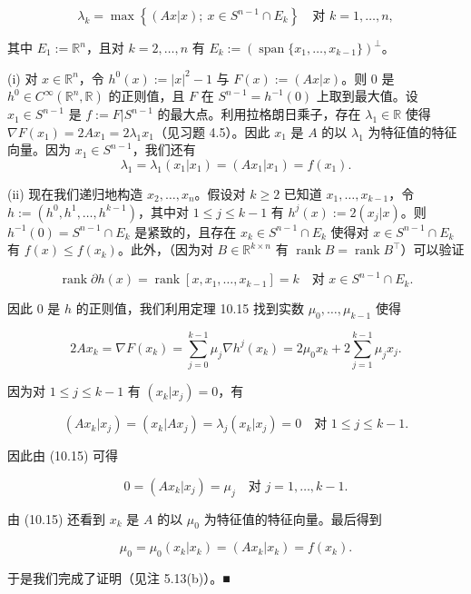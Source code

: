 \begin{example}
\begin{items}
\[
\lambda_{k} = \max\left\{ (Ax|x) ;\ x \in S^{n-1}\cap E_{k} \right\} \quad \text{对 } k = 1, \ldots, n ,
\]

其中 $ E_{1} := \mathbb{R}^{n} $，且对 $ k = 2, \ldots, n $ 有 $ E_{k} := \left(\operatorname{span}\{x_{1}, \ldots, x_{k-1}\}\right)^{\perp} $。

\proofhead
(i) 对 $ x \in \mathbb{R}^{n} $，令 $ h^{0}(x) := |x|^{2} - 1 $ 与 $ F(x) := (Ax|x) $。则 0 是 $ h^{0} \in C^{\infty}(\mathbb{R}^{n},\mathbb{R}) $ 的正则值，且 $ F $ 在 $ S^{n-1} = h^{-1}(0) $ 上取到最大值。设 $ x_{1} \in S^{n-1} $ 是 $ f := F|S^{n-1} $ 的最大点。利用拉格朗日乘子，存在 $ \lambda_{1} \in \mathbb{R} $ 使得 $ \nabla F(x_{1}) = 2Ax_{1} = 2\lambda_{1}x_{1} $（见习题 4.5）。因此 $ x_{1} $ 是 $ A $ 的以 $ \lambda_{1} $ 为特征值的特征向量。因为 $ x_{1} \in S^{n-1} $，我们还有
\[
\lambda_{1} = \lambda_{1}(x_{1}|x_{1}) = (Ax_{1}|x_{1}) = f(x_{1}) .
\]
\end{items}

(ii) 现在我们递归地构造 $ x_{2}, \ldots, x_{n} $。假设对 $ k \ge 2 $ 已知道 $ x_{1}, \ldots, x_{k-1} $，令 $ h := (h^{0}, h^{1}, \ldots, h^{k-1}) $，其中对 $ 1 \le j \le k-1 $ 有 $ h^{j}(x) := 2(x_{j}|x) $。则 $ h^{-1}(0) = S^{n-1}\cap E_{k} $ 是紧致的，且存在 $ x_{k} \in S^{n-1}\cap E_{k} $ 使得对 $ x \in S^{n-1}\cap E_{k} $ 有 $ f(x) \le f(x_{k}) $。此外，（因为对 $ B \in \mathbb{R}^{k\times n} $ 有 $ \operatorname{rank} B = \operatorname{rank} B^{\top} $）可以验证

\[
\operatorname{rank}\partial h(x) = \operatorname{rank}[x, x_{1}, \ldots, x_{k-1}] = k \quad \text{对 } x \in S^{n-1}\cap E_{k} .
\]

因此 0 是 $ h $ 的正则值，我们利用定理 10.15 找到实数 $ \mu_{0}, \ldots, \mu_{k-1} $ 使得

\begin{equation}
2Ax_{k} = \nabla F(x_{k}) = \sum_{j=0}^{k-1}\mu_{j}\nabla h^{j}(x_{k}) = 2\mu_{0}x_{k} + 2\sum_{j=1}^{k-1}\mu_{j}x_{j} .\tag{10.15}
\end{equation}

因为对 $ 1 \le j \le k-1 $ 有 $ (x_{k}|x_{j}) = 0 $，有

\[
(Ax_{k}|x_{j}) = (x_{k}|Ax_{j}) = \lambda_{j}(x_{k}|x_{j}) = 0 \quad \text{对 } 1 \le j \le k-1 .
\]

因此由 (10.15) 可得

\[
0 = (Ax_{k}|x_{j}) = \mu_{j} \quad \text{对 } j = 1, \ldots, k-1 .
\]

由 (10.15) 还看到 $ x_{k} $ 是 $ A $ 的以 $ \mu_{0} $ 为特征值的特征向量。最后得到

\[
\mu_{0} = \mu_{0}(x_{k}|x_{k}) = (Ax_{k}|x_{k}) = f(x_{k}) .
\]

于是我们完成了证明（见注 5.13(b)）。\nobreak\hspace{0.35em}■

\end{example}

